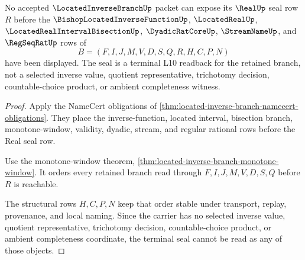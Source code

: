 \begin{theorem}
\label{thm:located-inverse-branch-real-seal}
No accepted $\LocatedInverseBranchUp$ packet can expose its $\RealUp$ seal row $R$ before the $\BishopLocatedInverseFunctionUp$, $\LocatedRealUp$, $\LocatedRealIntervalBisectionUp$, $\DyadicRatCoreUp$, $\StreamNameUp$, and $\RegSeqRatUp$ rows of
$$
B=(F,I,J,M,V,D,S,Q,R,H,C,P,N)
$$
have been displayed. The seal is a terminal L10 readback for the retained branch, not a selected inverse value, quotient representative, trichotomy decision, countable-choice product, or ambient completeness witness.
\end{theorem}
\begin{proof}
Apply the NameCert obligations of \autoref{thm:located-inverse-branch-namecert-obligations}. They place the inverse-function, located interval, bisection branch, monotone-window, validity, dyadic, stream, and regular rational rows before the Real seal row.

Use the monotone-window theorem, \autoref{thm:located-inverse-branch-monotone-window}. It orders every retained branch read through $F,I,J,M,V,D,S,Q$ before $R$ is reachable.

The structural rows $H,C,P,N$ keep that order stable under transport, replay, provenance, and local naming. Since the carrier has no selected inverse value, quotient representative, trichotomy decision, countable-choice product, or ambient completeness coordinate, the terminal seal cannot be read as any of those objects.
\end{proof}



